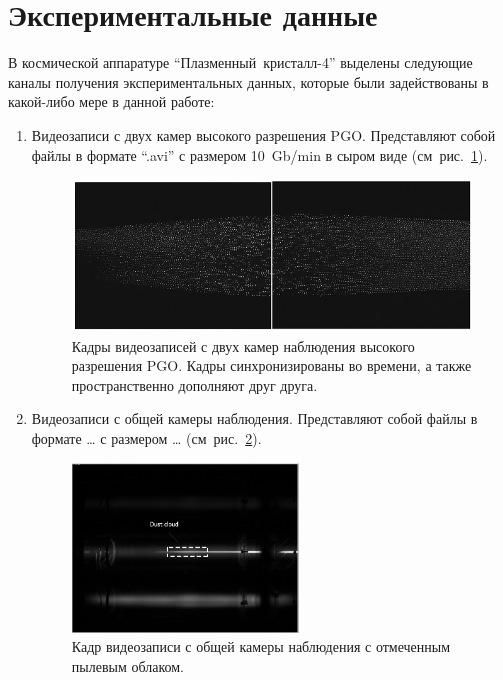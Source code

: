 \section{Экспериментальные данные}
\label{cha:ch_3_4}
В космической аппаратуре “Плазменный~кристалл-4” выделены следующие каналы получения экспериментальных данных,
которые были задействованы в какой-либо мере в данной работе:
\begin{enumerate}
    \item Видеозаписи с двух камер высокого разрешения PGO. Представляют собой файлы в формате “.avi” с размером 10~Gb/min в сыром виде (см~рис.~\ref{fig:fig32}).
    \begin{figure}
      \centering
      \includegraphics[width=12cm]{figures/fig32}
      \caption{Кадры видеозаписей с двух камер наблюдения высокого разрешения PGO. Кадры синхронизированы во времени, а также пространственно дополняют друг друга.}
      \label{fig:fig32}
    \end{figure}

    \item Видеозаписи с общей камеры наблюдения. Представляют собой файлы в формате … с размером … (см~рис.~\ref{fig:fig33}).
    \begin{figure}
      \centering
      \includegraphics[width=6cm]{figures/fig33}
      \caption{Кадр видеозаписи с общей камеры наблюдения с отмеченным пылевым облаком.}
      \label{fig:fig33}
    \end{figure}


\end{enumerate}
